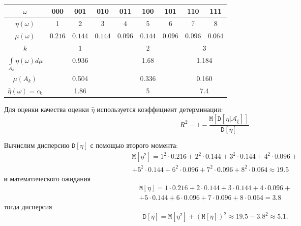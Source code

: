 \documentclass[a4paper,12pt]{article}
\newcommand{\expectation}[1]{\texttt{M} \left[ #1 \right]}
\newcommand{\variance}[1]{\texttt{D} \left[ #1 \right]}
\newcommand{\cvariance}[2]{\texttt{D} \left[ #1 | #2 \right]}
\begin{document}
\begin{center}
    \begin{tabular}{|c|c|c|c|c|c|c|c|c|}
        \hline
        $\omega$                                & 000                         & 001                         & 010                         & 011     & 100     & 101     & 110     & 111     \\
        \hline
        $\eta(\omega)$                          & 1                           & 2                           & 3                           & 4       & 5       & 6       & 7       & 8       \\
        \hline
        $\mu(\omega)$                           & $0.216$                     & $0.144$                     & $0.144$                     & $0.096$ & $0.144$ & $0.096$ & $0.096$ & $0.064$ \\
        \hline
        $k$                                     & \multicolumn{3}{|c|}{1}     & \multicolumn{3}{|c|}{2}     & \multicolumn{2}{|c|}{3}                                                       \\
        \hline
        $\int \limits_{A_k} \eta(\omega) d \mu$ & \multicolumn{3}{|c|}{0.936} & \multicolumn{3}{|c|}{1.68}  & \multicolumn{2}{|c|}{1.184}                                                   \\
        \hline
        $\mu(A_k)$                              & \multicolumn{3}{|c|}{0.504} & \multicolumn{3}{|c|}{0.336} & \multicolumn{2}{|c|}{0.160}                                                   \\
        \hline
        $\widehat{\eta}(\omega) = c_k$          & \multicolumn{3}{|c|}{1.86}  & \multicolumn{3}{|c|}{5}     & \multicolumn{2}{|c|}{7.4}                                                     \\
        \hline
    \end{tabular}
\end{center}

Для оценки качества оценки $\widehat{\eta}$ используется коэффициент детерминации:
\[
    R^2 = 1 - \frac{\expectation{\cvariance{\eta}{\mathcal{A}_\xi}}}{\variance{\eta}} .
\]

Вычислим дисперсию $\variance{\eta}$ с помощью второго момента:
\begin{multline*}
    \expectation{\eta^2}
    = 1^2 \cdot 0.216 + 2^2 \cdot 0.144 + 3^2 \cdot 0.144 + 4^2 \cdot 0.096 + \\
    + 5^2 \cdot 0.144 + 6^2 \cdot 0.096 + 7^2 \cdot 0.096 + 8^2 \cdot 0.064
    \approx 19.5
\end{multline*}
и математического ожидания
\begin{multline*}
    \expectation{\eta}
    = 1 \cdot 0.216 + 2 \cdot 0.144 + 3 \cdot 0.144 + 4 \cdot 0.096 + \\
    + 5 \cdot 0.144 + 6 \cdot 0.096 + 7 \cdot 0.096 + 8 \cdot 0.064
    = 3.8
\end{multline*}
тогда дисперсия
\[
    \variance{\eta}
    = \expectation{\eta^2} + \left( \expectation{\eta} \right)^2
    \approx 19.5 - 3.8^2
    \approx 5.1 .
\]
\end{document}

